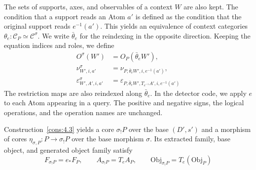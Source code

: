\begin{construction}
The sets of supports, axes, and observables of a context $W$ are also kept. The condition
that a support reads an Atom $a'$ is defined as the condition that the original support
reads $e^{-1}(a')$.
This yields an equivalence of context categories $\theta_e:\mathcal{C}_P\simeq \mathcal{C}^\sigma$.
We write $\bar\theta_e$ for the reindexing in the opposite direction.
Keeping the equation indices and roles, we define
\begin{equation*}
\begin{aligned}
O^\sigma(W')&=O_P(\bar\theta_eW'),\\
\nu^\sigma_{W',i,a'}&=\nu_{P,\bar\theta_eW',i,e^{-1}(a')},\\
\varepsilon^\sigma_{W',A',i,a'}
 &=\varepsilon_{P,\bar\theta_eW',T_{e^{-1}}A',i,e^{-1}(a')}
\end{aligned}
\tag{4.6}\label{eq:4.6}
\end{equation*}
The restriction maps are also reindexed along $\bar\theta_e$.
In the detector code, we apply $e$ to each Atom appearing in a query.
The positive and negative signs, the logical operations, and the operation names are
unchanged.

\end{construction}

\begin{proposition}\label{prop:4.4}

Construction~\ref{cons:4.3} yields a core $\sigma_!P$ over the base $(D',s')$ and a
morphism of cores
$\eta_{\sigma,P}:P\to\sigma_!P$ over the base morphism $\sigma$.
Its extracted family, base object, and generated object family satisfy
\begin{equation*}
F_{\sigma_!P}=e_*F_P,\qquad
A_{\sigma_!P}=T_eA_P,\qquad
\mathrm{Obj}_{\sigma_!P}=T_e(\mathrm{Obj}_P)
\tag{4.7}\label{eq:4.7}
\end{equation*}
\end{proposition}

